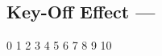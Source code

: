 \subsection[Key-Off Effect]{Key-Off Effect --- \UiKey{\I}\UiKey{\SET}}









































0
1
2
3
4
5
6
7
8
9
10
